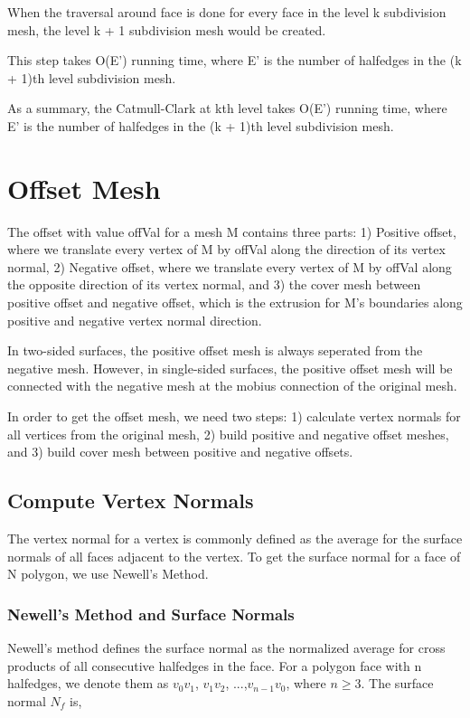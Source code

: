 \documentclass[12pt]{article}
\begin{document}
When the traversal around face is done for every face in the level k subdivision mesh, the level k + 1 subdivision mesh would be created.

This step takes O(E') running time, where E' is the number of halfedges in the (k + 1)th level subdivision mesh.

As a summary, the Catmull-Clark at kth level takes O(E') running time, where E' is the number of halfedges in the (k + 1)th level subdivision mesh.

\section{Offset Mesh} \label{sec:offset}

The offset with value offVal for a mesh M contains three parts: 1) Positive offset, where we translate every vertex of M by offVal along the direction of its vertex normal, 2) Negative offset, where we translate every vertex of M by offVal along the opposite direction of its vertex normal, and 3) the cover mesh between positive offset and negative offset, which is the extrusion for M's boundaries along positive and negative vertex normal direction.

In two-sided surfaces, the positive offset mesh is always seperated from the negative mesh. However, in single-sided surfaces, the positive offset mesh will be connected with the negative mesh at the mobius connection of the original mesh.

In order to get the offset mesh, we need two steps: 1) calculate vertex normals for all vertices from the original mesh, 2) build positive and negative offset meshes, and 3) build cover mesh between positive and negative offsets.

\subsection{Compute Vertex Normals}
The vertex normal for a vertex is commonly defined as the average for the surface normals of all faces adjacent to the vertex. To get the surface normal for a face of N polygon, we use Newell's Method.

\subsubsection{Newell's Method and Surface Normals}
Newell's method defines the surface normal as the normalized average for cross products of all consecutive halfedges in the face. For a polygon face with n halfedges, we denote them as $v_0v_1$, $v_1v_2$, ...,$v_{n-1}v_0$, where $ n \ge 3$. The surface normal $N_{f}$ is,
\end{document}
